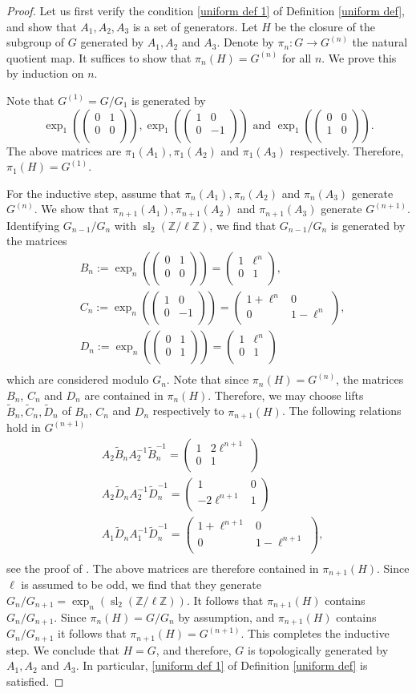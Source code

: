 \documentclass[11pt]{amsart}
\numberwithin{equation}{section}
\theoremstyle{remark}
\newcommand{\Z}{\mathbb{Z}}
\newcommand{\op}[1]{\operatorname{#1}}
\newcommand\mtx[4] { \left( {\begin{array}{cc}
 #1 & #2 \\
 #3 & #4 \\
 \end{array} } \right)}
\begin{document}
\begin{proof}
Let us first verify the condition \eqref{uniform def 1} of Definition \ref{uniform def}, and show that $A_1, A_2, A_3$ is a set of generators. Let $H$ be the closure of the subgroup of $G$ generated by $A_1, A_2$ and $A_3$. Denote by $\pi_n:G\rightarrow G^{(n)}$ the natural quotient map. It suffices to show that $\pi_n(H)=G^{(n)}$ for all $n$. We prove this by induction on $n$.

\par Note that $G^{(1)}=G/G_1$ is generated by 
\[\op{exp}_1\left(\mtx{0}{1}{0}{0}\right), \op{exp}_1\left(\mtx{1}{0}{0}{-1}\right)\text{ and }\op{exp}_1\left(\mtx{0}{0}{1}{0}\right).\]The above matrices are $\pi_1(A_1), \pi_1(A_2)$ and $\pi_1(A_3)$ respectively. Therefore, $\pi_1(H)=G^{(1)}$.
\par For the inductive step, assume that $\pi_n(A_1), \pi_n(A_2)$ and $\pi_n(A_3)$ generate $G^{(n)}$. We show that $\pi_{n+1}(A_1), \pi_{n+1}(A_2)$ and $\pi_{n+1}(A_3)$ generate $G^{(n+1)}$. Identifying $G_{n-1}/G_{n}$ with $\op{sl}_2(\Z/\ell\Z)$, we find that $G_{n-1}/G_{n}$ is generated by the matrices\[\begin{split}&B_n:=\op{exp}_{n}\left(\mtx{0}{1}{0}{0}\right)=\mtx{1}{\ell^{n}}{0}{1}, \\
&C_n:=\op{exp}_{n}\left(\mtx{1}{0}{0}{-1}\right)=\mtx{1+\ell^{n}}{0}{0}{1-\ell^{n}}, \\
&D_n:=\op{exp}_{n}\left(\mtx{0}{1}{0}{1}\right)=\mtx{1}{\ell^{n}}{0}{1}\\
\end{split}\]
which are considered modulo $G_{n}$. Note that since $\pi_{n}(H)=G^{(n)}$, the matrices $B_n$, $C_n$ and $D_n$ are contained in $\pi_n(H)$. Therefore, we may choose lifts $\tilde{B}_n, \tilde{C}_n, \tilde{D}_n$ of $B_n$, $C_n$ and $D_n$ respectively to $\pi_{n+1}(H)$. The following relations hold in $G^{(n+1)}$
\[\begin{split}& A_2 \tilde{B}_n A_2^{-1} \tilde{B}_n^{-1}=\mtx{1}{2\ell^{n+1}}{0}{1}\\
& A_2 \tilde{D}_n A_2^{-1} \tilde{D}_n^{-1}=\mtx{1}{0}{-2\ell^{n+1}}{1}\\
& A_1 \tilde{D}_n A_1^{-1} \tilde{D}_n^{-1}=\mtx{1+\ell^{n+1}}{0}{0}{1-\ell^{n+1}},\\
\end{split}\]
see the proof of \cite[Lemma 2.8]{ray2021constructing}. The above matrices are therefore contained in $\pi_{n+1}(H)$. Since $\ell$ is assumed to be odd, we find that they generate $G_n/G_{n+1}=\op{exp}_n\left(\op{sl}_2(\Z/\ell\Z)\right)$. It follows that $\pi_{n+1}(H)$ contains $G_n/G_{n+1}$. Since $\pi_n(H)=G/G_n$ by assumption, and $\pi_{n+1}(H)$ contains $G_n/G_{n+1}$ it follows that $\pi_{n+1}(H)=G^{(n+1)}$. This completes the inductive step. We conclude that $H=G$, and therefore, $G$ is topologically generated by $A_1, A_2$ and $A_3$. In particular, \eqref{uniform def 1} of Definition \ref{uniform def} is satisfied. 

\end{proof}
\end{document}
